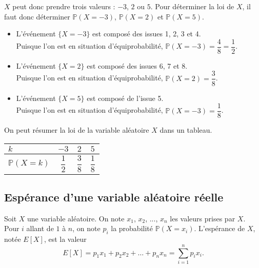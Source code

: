\documentclass[11pt,fleqn, openany]{book} %
\begin{document}
\begin{example}
$X$ peut donc prendre trois valeurs : $-3$, $2$ ou $5$. Pour déterminer la loi de $X$, il faut donc déterminer $\mathbb{P}(X=-3)$, $\mathbb{P}(X=2)$ et $\mathbb{P}(X=5)$.
\begin{itemize}
\item L'événement $\{X=-3\}$ est composé des issues 1, 2, 3 et 4. \\ Puisque l'on est en situation d'équiprobabilité, $\mathbb{P}(X=-3)=\dfrac{4}{8}=\dfrac{1}{2}$.
\vskip5pt
\item L'événement $\{X=2\}$ est composé des issues 6, 7 et 8. \\ Puisque l'on est en situation d'équiprobabilité, $\mathbb{P}(X=2)=\dfrac{3}{8}$.
\vskip5pt
\item L'événement $\{X=5\}$ est composé de l'issue 5. \\ Puisque l'on est en situation d'équiprobabilité, $\mathbb{P}(X=-3)=\dfrac{1}{8}$.
\end{itemize}
On peut résumer la loi de la variable aléatoire $X$ dans un tableau.
\renewcommand{\arraystretch}{2.2}
\begin{center}
\begin{tabular}{|l|c|c|c|}
\hline
$k$ & $-3$ & $2$ & $5$ \\
\hline
$\mathbb{P}(X=k)$ & $\dfrac{1}{2}$ & $\dfrac{3}{8}$ & $\dfrac{1}{8}$ \\
\hline \end{tabular}
\end{center}
\end{example}


\subsection{Espérance d'une variable aléatoire réelle}

\begin{definition}Soit $X$ une variable aléatoire. On note $x_1$, $x_2$, ..., $x_n$ les valeurs prises par $X$.\\
Pour $i$ allant de $1$ à $n$, on note $p_i$ la probabilité $\mathbb{P}(X=x_i)$. L'espérance de $X$, notée $E[X]$, est la valeur
\[ E[X]= p_1x_1+p_2x_2+\ldots + p_n x_n = \sum _{i=1}^{n} p_i x_i.\]\end{definition}
\end{document}
